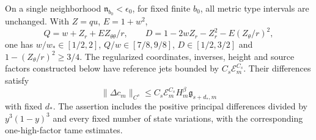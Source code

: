 \begin{proposition}
\label{prop:uniform-physical-geometry}
\label{lem:common-geometric-neighborhood}
\label{lem:current-geometric-jets}
On a single neighborhood $\mathfrak n_{b_0}<\epsilon_0$, for fixed
finite $b_0$, all metric type intervals are unchanged. With
$Z=qu$, $E=1+w^2$,
\[
 Q=w+Z_r+EZ_{\theta\theta}/r,\qquad
 D=1-2wZ_r-Z_r^2-E(Z_\theta/r)^2,
\]
one has $w/w_*\in[1/2,2]$, $Q/w\in[7/8,9/8]$, $D\in[1/2,3/2]$
and $1-(Z_\theta/r)^2\ge3/4$.
The regularized coordinates, inverses, height and source factors
constructed below have reference jets bounded by
$C_s\mathcal E_m^{C_s}$. Their differences satisfy
\begin{equation}\label{eq:geometry-current-jet-bound}
 \|\Delta c_m\|_{C^s}
 \le C_s\mathcal E_m^{C_s}H_m^\beta\mathfrak g_{s+d_*,m}
\end{equation}
with fixed $d_*$. The assertion includes the positive principal
differences divided by $y^3(1-y)^3$ and every fixed number of state
variations, with the corresponding one-high-factor tame estimates.
\end{proposition}

